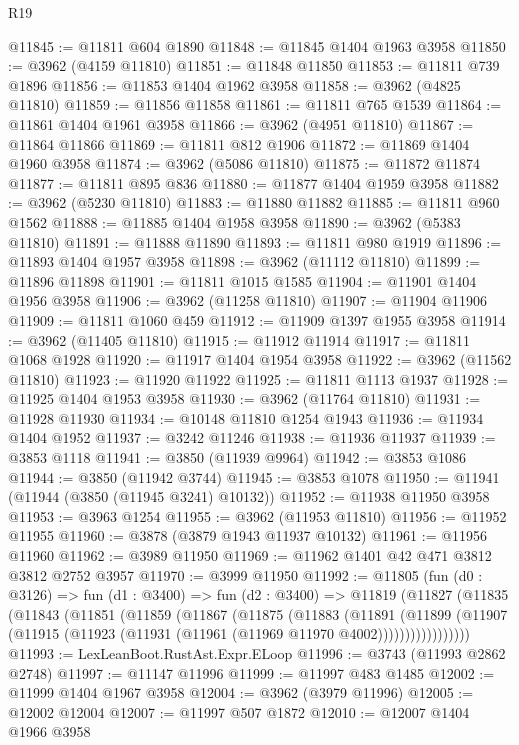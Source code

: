 \begin{lexlean}{R19}
\begin{coremodule}
@11845 := @11811 @604 @1890
@11848 := @11845 @1404 @1963 @3958
@11850 := @3962 (@4159 @11810)
@11851 := @11848 @11850
@11853 := @11811 @739 @1896
@11856 := @11853 @1404 @1962 @3958
@11858 := @3962 (@4825 @11810)
@11859 := @11856 @11858
@11861 := @11811 @765 @1539
@11864 := @11861 @1404 @1961 @3958
@11866 := @3962 (@4951 @11810)
@11867 := @11864 @11866
@11869 := @11811 @812 @1906
@11872 := @11869 @1404 @1960 @3958
@11874 := @3962 (@5086 @11810)
@11875 := @11872 @11874
@11877 := @11811 @895 @836
@11880 := @11877 @1404 @1959 @3958
@11882 := @3962 (@5230 @11810)
@11883 := @11880 @11882
@11885 := @11811 @960 @1562
@11888 := @11885 @1404 @1958 @3958
@11890 := @3962 (@5383 @11810)
@11891 := @11888 @11890
@11893 := @11811 @980 @1919
@11896 := @11893 @1404 @1957 @3958
@11898 := @3962 (@11112 @11810)
@11899 := @11896 @11898
@11901 := @11811 @1015 @1585
@11904 := @11901 @1404 @1956 @3958
@11906 := @3962 (@11258 @11810)
@11907 := @11904 @11906
@11909 := @11811 @1060 @459
@11912 := @11909 @1397 @1955 @3958
@11914 := @3962 (@11405 @11810)
@11915 := @11912 @11914
@11917 := @11811 @1068 @1928
@11920 := @11917 @1404 @1954 @3958
@11922 := @3962 (@11562 @11810)
@11923 := @11920 @11922
@11925 := @11811 @1113 @1937
@11928 := @11925 @1404 @1953 @3958
@11930 := @3962 (@11764 @11810)
@11931 := @11928 @11930
@11934 := @10148 @11810 @1254 @1943
@11936 := @11934 @1404 @1952
@11937 := @3242 @11246
@11938 := @11936 @11937
@11939 := @3853 @1118
@11941 := @3850 (@11939 @9964)
@11942 := @3853 @1086
@11944 := @3850 (@11942 @3744)
@11945 := @3853 @1078
@11950 := @11941 (@11944 (@3850 (@11945 @3241) @10132))
@11952 := @11938 @11950 @3958
@11953 := @3963 @1254
@11955 := @3962 (@11953 @11810)
@11956 := @11952 @11955
@11960 := @3878 (@3879 @1943 @11937 @10132)
@11961 := @11956 @11960
@11962 := @3989 @11950
@11969 := @11962 @1401 @42 @471 @3812 @3812 @2752 @3957
@11970 := @3999 @11950
@11992 := @11805
    (fun (d0 : @3126) =>
    fun (d1 : @3400) =>
    fun (d2 : @3400) =>
    @11819
      (@11827
        (@11835
          (@11843
            (@11851
              (@11859
                (@11867
                  (@11875
                    (@11883
                      (@11891
                        (@11899
                          (@11907
                            (@11915 (@11923 (@11931 (@11961 (@11969 @11970 @4002)))))))))))))))))
@11993 := LexLeanBoot.RustAst.Expr.ELoop
@11996 := @3743 (@11993 @2862 @2748)
@11997 := @11147 @11996
@11999 := @11997 @483 @1485
@12002 := @11999 @1404 @1967 @3958
@12004 := @3962 (@3979 @11996)
@12005 := @12002 @12004
@12007 := @11997 @507 @1872
@12010 := @12007 @1404 @1966 @3958

\end{coremodule}
\end{lexlean}
